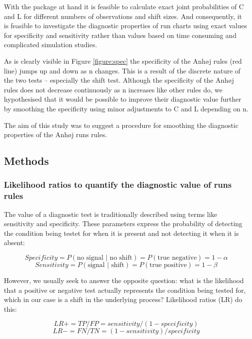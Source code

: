 With the  package at hand it is feasible to calculate
exact joint probabilities of C and L for different numbers of
observations and shift sizes. And consequently, it is feasible to
investigate the diagnostic properties of run charts using exact values
for specificity and sensitivity rather than values based on time
consuming and complicated simulation studies.

As is clearly visible in Figure \ref{figure:spec} the specificity of the
Anhøj rules (red line) jumps up and down as n changes. This is a result
of the discrete nature of the two tests -- especially the shift test.
Although the specificity of the Anhøj rules does not decrease
continuously as n increases like other rules do, we hypothesised that it
would be possible to improve their diagnostic value further by smoothing
the specificity using minor adjustments to C and L depending on n.

The aim of this study was to suggest a procedure for smoothing the
diagnostic properties of the Anhøj runs rules.

\hypertarget{methods}{%
\subsection{Methods}\label{methods}}

\hypertarget{likelihood-ratios-to-quantify-the-diagnostic-value-of-runs-rules}{%
\subsubsection{Likelihood ratios to quantify the diagnostic value of
runs
rules}\label{likelihood-ratios-to-quantify-the-diagnostic-value-of-runs-rules}}

The value of a diagnostic test is traditionally described using terms
like sensitivity and specificity. These parameters express the
probability of detecting the condition being testet for when it is
present and not detecting it when it is absent:

\[ Specificity=P(\text{no signal | no shift})=P(\text{true negative})=1-\alpha \]
\[ Sensitivity=P(\text{signal | shift})=P(\text{true positive})=1-\beta \]

However, we usually seek to answer the opposite question: what is the
likelihood that a positive or negative test actually represents the
condition being tested for, which in our case is a shift in the
underlying process? Likelihood ratios (LR) do this:

\[ LR+=TP/FP=sensitivity/(1-specificity) \]
\[ LR-=FN/TN=(1-sensitivity)/specificity \]

